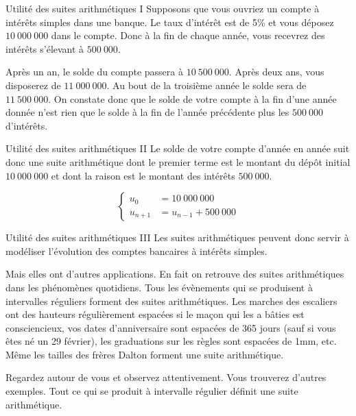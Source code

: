 \documentclass{beamer}
\begin{document}
\begin{frame}{Utilité des suites arithmétiques I}
  Supposons que vous ouvriez un compte à intérêts simples dans une banque. Le taux d'intérêt est de 5\% et vous déposez $10\ 000\ 000$ dans le compte. Donc à la fin de chaque année, vous recevrez des intérêts s'élevant à $500\ 000$.

  Après un an, le solde du compte passera à $10\ 500\ 000$. Après deux ans, vous disposerez de $11\ 000\ 000$. Au bout de la troisième année le solde sera de $11\ 500\ 000$. On constate donc que le solde de votre compte à la fin d'une année donnée n'est rien que le solde à la fin de l'année précédente plus les $500\ 000$ d'intérêts.
\end{frame}

\begin{frame}{Utilité des suites arithmétiques II}
  Le solde de votre compte d'année en année suit donc une suite arithmétique dont le premier terme est le montant du dépôt initial $10\ 000\ 000$ et dont la raison est le montant des intérêts $500\ 000$.

  \[
    \begin{cases}
      u_0 &= 10\ 000\ 000 \\
      u_{n+1} &= u_{n-1} + 500\ 000
    \end{cases}
  \]
\end{frame}

\begin{frame}{Utilité des suites arithmétiques III}
  Les suites arithmétiques peuvent donc servir à modéliser l'évolution des comptes bancaires à intérêts simples.

  Mais elles ont d'autres applications. En fait on retrouve des suites arithmétiques dans les phénomènes quotidiens. Tous les évènements qui se produisent à intervalles réguliers forment des suites arithmétiques. Les marches des escaliers ont des hauteurs régulièrement espacées si le maçon qui les a bâties est consciencieux, vos dates d'anniversaire sont espacées de 365 jours (sauf si vous êtes né un 29 février), les graduations sur les règles sont espacées de 1mm, etc. Même les tailles des frères Dalton forment une suite arithmétique.

  Regardez autour de vous et observez attentivement. Vous trouverez d'autres exemples. Tout ce qui se produit à intervalle régulier définit une suite arithmétique.
\end{frame}
\end{document}
